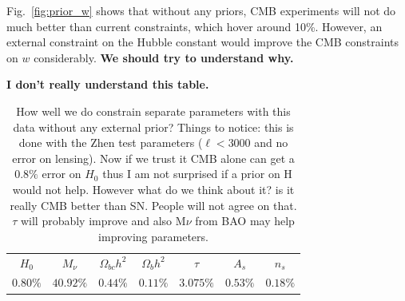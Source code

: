 \documentclass[aps,prd,reprint,superscriptaddress]{revtex4-1}
\newcommand{\reffig}[1]{Fig.~\ref{fig:#1}}
\begin{document}
\reffig{prior_w} shows that without any priors, CMB experiments will not do much better than current constraints, which hover around 10\%. However, an external constraint on the Hubble constant would improve the CMB constraints on $w$ considerably. {\bf We should try to understand why.}


{\bf I don't really understand this table.}
\begin{table}[htdp]

\begin{center}
\begin{tabular}{|c|c|c|c|c|c|c|}
\hline
$H_{0}$ &$ M_{\nu}$ &$\Omega_{bc}h^{2}$&$\Omega_{b}h^{2}$&$\tau$&$A_{s}$&$n_{s}$ \\
$0.80 \%$&$40.92\%$&$0.44\%$&$0.11\%$&$3.075\%$&$0.53\%$&$0.18\%$\\

\hline
\end{tabular}
\caption{How well we do constrain separate parameters with this data without any external prior? Things to notice: this is done with the Zhen test parameters ($\ell<3000$ and no error on lensing). Now if we trust it CMB alone can get a $0.8\%$ error on $H_{0}$ thus I am not surprised if a prior on H would not help. However what do we think about it? is it really CMB better than SN. People will not agree on that. $\tau$ will probably improve and also M$\nu$ from BAO may help improving parameters.}
\end{center}
\label{default}
\end{table}%



%
\end{document}
